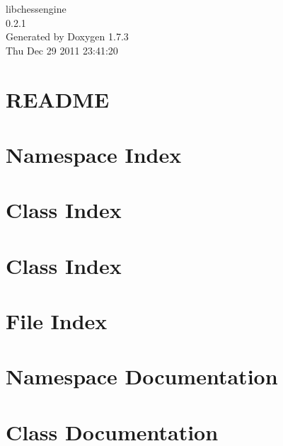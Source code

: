 \documentclass[a4paper]{book}
\begin{document}
\hypersetup{pageanchor=false}
\begin{titlepage}
\vspace*{7cm}
\begin{center}
{\Large libchessengine \\[1ex]\large 0.2.1 }\\
\vspace*{1cm}
{\large Generated by Doxygen 1.7.3}\\
\vspace*{0.5cm}
{\small Thu Dec 29 2011 23:41:20}\\
\end{center}
\end{titlepage}
\clearemptydoublepage
{}
\tableofcontents
\clearemptydoublepage
{}
\hypersetup{pageanchor=true}
\chapter{README}
\label{README}
\hypertarget{README}{}

\chapter{Namespace Index}

\chapter{Class Index}

\chapter{Class Index}

\chapter{File Index}

\chapter{Namespace Documentation}


\chapter{Class Documentation}

































\end{document}
